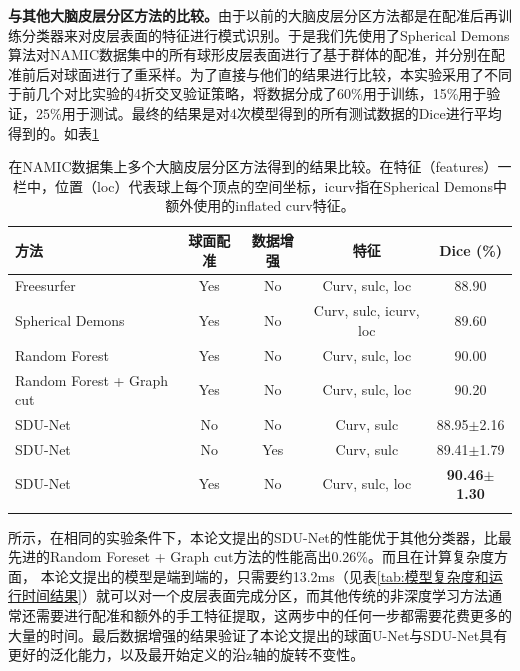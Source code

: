 \textbf{与其他大脑皮层分区方法的比较。}由于以前的大脑皮层分区方法\cite{yeo2009spherical,meng2015automatic,desikan2006automated}都是在配准后再训练分类器来对皮层表面的特征进行模式识别。于是我们先使用了Spherical Demons算法\cite{yeo2009spherical}对NAMIC数据集中的所有球形皮层表面进行了基于群体的配准，并分别在配准前后对球面进行了重采样。为了直接与他们的结果进行比较，本实验采用了不同于前几个对比实验的4折交叉验证策略，将数据分成了60\%用于训练，15\%用于验证，25\%用于测试。最终的结果是对4次模型得到的所有测试数据的Dice进行平均得到的。如表\ref{tab:与其他脑皮层分区方法比较}
\begin{table}[h]
		\caption{在NAMIC数据集上多个大脑皮层分区方法得到的结果比较。在特征（features）一栏中，位置（loc）代表球上每个顶点的空间坐标，icurv指在Spherical Demons中额外使用的inflated curv特征。}
		\label{tab:与其他脑皮层分区方法比较}
		\centering
		\begin{tabularx}{\linewidth}{lcccc}
			\Xhline{2\arrayrulewidth}
			方法 & 球面配准 & 数据增强 & 特征 &  Dice (\%) \\
			\hline
			Freesurfer \cite{desikan2006automated}         & Yes  & No   & Curv, sulc, loc                & 88.90 \\
			Spherical Demons \cite{yeo2009spherical}   & Yes  & No   & Curv, sulc, icurv, loc & 89.60  \\
			Random Forest \cite{meng2015automatic}      & Yes  & No   & Curv, sulc, loc                & 90.00  \\
			Random Forest + Graph cut \cite{meng2015automatic} & Yes & No & Curv, sulc, loc & 90.20 \\
			SDU-Net	 & No & No & Curv, sulc & 88.95$\pm$2.16 \\
			SDU-Net  & No & Yes & Curv, sulc & 89.41$\pm$1.79 \\
			SDU-Net	 & Yes & No & Curv, sulc, loc & \textbf{90.46$\pm$1.30} \\
			\Xhline{2\arrayrulewidth} 
		\end{tabularx}
\end{table}
所示，在相同的实验条件下，本论文提出的SDU-Net的性能优于其他分类器，比最先进的Random Foreset + Graph cut\cite{meng2015automatic}方法的性能高出0.26\%。而且在计算复杂度方面，
本论文提出的模型是端到端的，只需要约13.2ms（见表\ref{tab:模型复杂度和运行时间结果}）就可以对一个皮层表面完成分区，而其他传统的非深度学习方法通常还需要进行配准和额外的手工特征提取，这两步中的任何一步都需要花费更多的大量的时间。最后数据增强的结果验证了本论文提出的球面U-Net与SDU-Net具有更好的泛化能力，以及最开始定义的沿z轴的旋转不变性。



